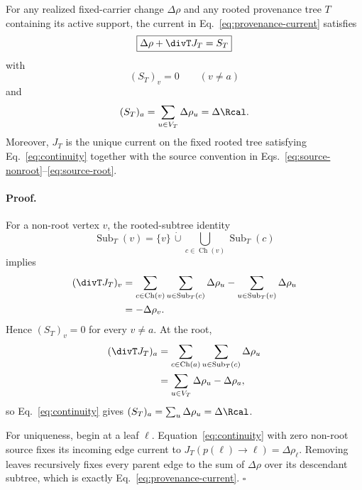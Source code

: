 \begin{theorem}
\label{thm:provenance-closure}
For any realized fixed-carrier change $\Delta\rho$ and any rooted provenance tree $T$ containing its active support, the current in Eq.~\eqref{eq:provenance-current} satisfies
\begin{equation}
\boxed{
\Delta\rho+\divT J_T=S_T
}
\label{eq:continuity}
\end{equation}
with
\begin{equation}
(S_T)_v=0
\qquad
(v\neq a)
\label{eq:source-nonroot}
\end{equation}
and
\begin{equation}
(S_T)_a
=\sum_{u\in V_T}\Delta\rho_u
=\Delta\Rcal.
\label{eq:source-root}
\end{equation}
Moreover, $J_T$ is the unique current on the fixed rooted tree satisfying Eq.~\eqref{eq:continuity} together with the source convention in Eqs.~\eqref{eq:source-nonroot}--\eqref{eq:source-root}.
\end{theorem}

\paragraph*{Proof.}
For a non-root vertex $v$, the rooted-subtree identity
\begin{equation}
\operatorname{Sub}_T(v)
=
\{v\}\,\dot\cup\!
\bigcup_{c\in\operatorname{Ch}(v)}
\operatorname{Sub}_T(c)
\end{equation}
implies
\begin{align}
(\divT J_T)_v
&=
\sum_{c\in\operatorname{Ch}(v)}
\sum_{u\in\operatorname{Sub}_T(c)}\Delta\rho_u
-
\sum_{u\in\operatorname{Sub}_T(v)}\Delta\rho_u\\
&=-\Delta\rho_v.
\end{align}
Hence $(S_T)_v=0$ for every $v\neq a$. At the root,
\begin{align}
(\divT J_T)_a
&=
\sum_{c\in\operatorname{Ch}(a)}
\sum_{u\in\operatorname{Sub}_T(c)}\Delta\rho_u\\
&=
\sum_{u\in V_T}\Delta\rho_u-\Delta\rho_a,
\end{align}
so Eq.~\eqref{eq:continuity} gives $(S_T)_a=\sum_u\Delta\rho_u=\Delta\Rcal$.

For uniqueness, begin at a leaf $\ell$. Equation~\eqref{eq:continuity} with zero non-root source fixes its incoming edge current to $J_T(p(\ell)\to\ell)=\Delta\rho_\ell$. Removing leaves recursively fixes every parent edge to the sum of $\Delta\rho$ over its descendant subtree, which is exactly Eq.~\eqref{eq:provenance-current}. \hfill$\square$

